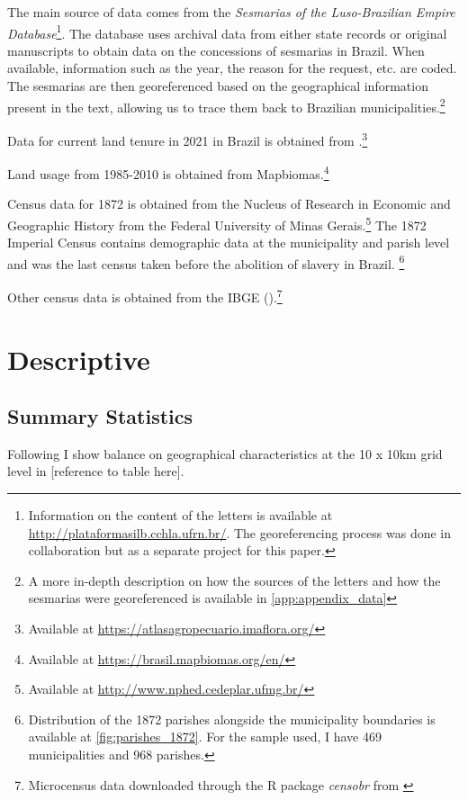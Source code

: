 \documentclass{article}
\begin{document}
The main source of data comes from the \textit{Sesmarias of the Luso-Brazilian Empire Database}\footnote{
  Information on the content of the letters is available at \url{http://plataformasilb.cchla.ufrn.br/}. The georeferencing process was done in collaboration but as a separate project for this paper.}.
The database uses archival data from either state records or original manuscripts to obtain data on the concessions of sesmarias in Brazil. 
When available, information such as the year, the reason for the request, etc. are coded. 
The sesmarias are then georeferenced based on the geographical information present in the text, allowing us to trace them back to Brazilian municipalities.\footnote{A more in-depth description on how the sources of the letters and how the sesmarias were georeferenced is available in \autoref{app:appendix_data}}

Data for current land tenure in 2021 in Brazil is obtained from \textcite{Sparovek2019-dn}.\footnote{
  Available at \url{https://atlasagropecuario.imaflora.org/}}

Land usage from 1985-2010 is obtained from Mapbiomas.\textcite{Souza2020-kb}\footnote{
  Available at \url{https://brasil.mapbiomas.org/en/}}

Census data for 1872 is obtained from the Nucleus of Research in Economic and Geographic History from the Federal University of Minas Gerais.\footnote{
  Available at \url{http://www.nphed.cedeplar.ufmg.br/}}
The 1872 Imperial Census contains demographic data at the municipality and parish level and was the last census taken before the abolition of slavery in Brazil. \footnote{Distribution of the 1872 parishes alongside the municipality boundaries is available at \autoref{fig:parishes_1872}. For the sample used, I have 469 municipalities and 968 parishes.}

Other census data is obtained from the IBGE (\textit{}).\footnote{Microcensus data downloaded through the R package \textit{censobr} from \textcite{Pereira2023-qv}}

\section{Descriptive}

\subsection{Summary Statistics}

Following \textcite{Lowes2021-ww} I show balance on geographical characteristics at the 10 x 10km grid level in [reference to table here].
\end{document}

